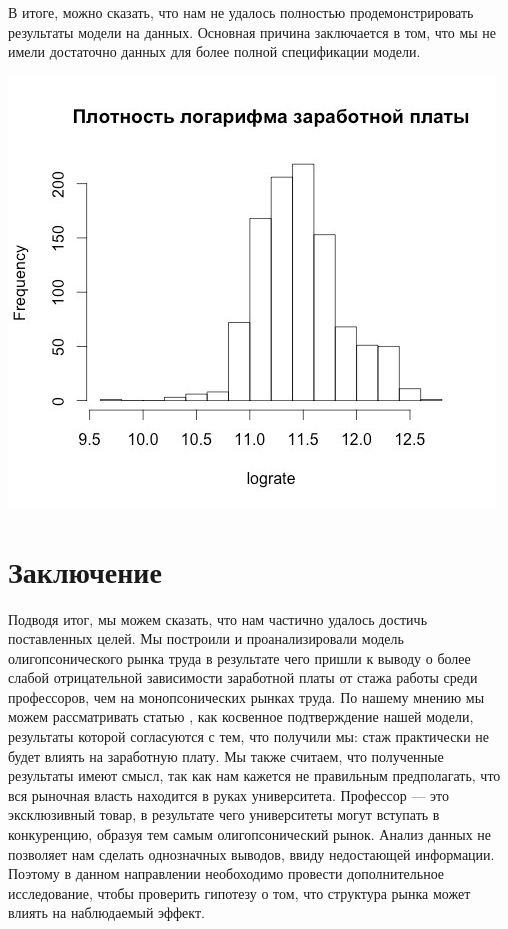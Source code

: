 \documentclass[a4paper, 12pt]{article}
\theoremstyle{definition}
\theoremstyle{plain}
\begin{document}
В итоге, можно сказать, что нам не удалось полностью продемонстрировать результаты модели на данных. Основная причина заключается в том, что мы не имели достаточно данных для более полной спецификации модели.



\begin{center}
\includegraphics[scale=0.5]{image1}
\end{center}

\section{Заключение}

Подводя итог, мы можем сказать, что нам частично удалось достичь поставленных целей. Мы построили и проанализировали модель олигопсонического рынка труда в результате чего пришли к выводу о более слабой отрицательной зависимости заработной платы от стажа работы среди профессоров, чем на монопсонических рынках труда.  По нашему мнению мы можем рассматривать статью \cite{3}, как косвенное подтверждение нашей модели, результаты которой согласуются с тем, что получили мы: стаж практически не будет влиять на заработную плату.   Мы также считаем, что полученные результаты имеют смысл, так как нам кажется не правильным предполагать, что вся рыночная власть находится в руках университета. Профессор --- это эксклюзивный товар, в результате чего университеты могут вступать в конкуренцию, образуя тем самым олигопсонический рынок.  Анализ данных не позволяет нам сделать однозначных выводов, ввиду недостающей информации. Поэтому в данном направлении необоходимо провести дополнительное исследование, чтобы проверить  гипотезу о том, что структура рынка может влиять на наблюдаемый эффект. 
\end{document}
